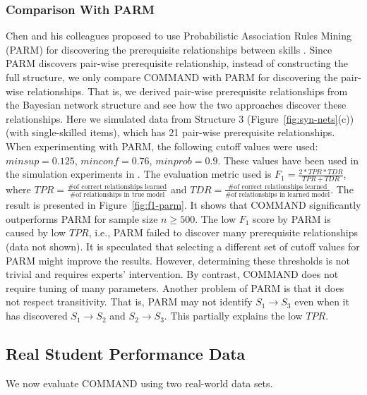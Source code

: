 \documentclass{edm_template}
\begin{document}
	\subsubsection{Comparison With PARM}
	Chen and his colleagues proposed to use Probabilistic Association Rules Mining (PARM) for discovering the prerequisite relationships between skills \cite{chen2015discovering}.
	Since PARM discovers pair-wise prerequisite relationship, instead of constructing the full structure,
	we only compare COMMAND with PARM for discovering the pair-wise relationships.
	That is, we derived pair-wise prerequisite relationships from the Bayesian network structure and see how the two approaches discover these relationships.
	Here we simulated data from Structure 3 (Figure~\ref{fig:syn-nets}(c)) (with single-skilled items), which has 21 pair-wise prerequisite relationships.
	When experimenting with PARM, the following cutoff values were used: $ minsup=0.125$, $minconf=0.76$, $minprob=0.9$.
	These values have been used in the simulation experiments in \cite{chen2015discovering}.
	The evaluation metric used is $F_1=\frac{2*TPR*TDR}{TPR+TDR}$, where $TPR=\frac{\text{\# of correct relationships learned}}{\text{\# of relationships in true model}}$
	and $TDR=\frac{\text{\# of correct relationships learned}}{\text{\# of relationships in learned model}}$.
	The result is presented in Figure~\ref{fig:f1-parm}. It shows that COMMAND significantly outperforms PARM for sample size $n\ge 500$.
	The low $F_1$ score by PARM is caused by low $TPR$, i.e., PARM failed to discover many prerequisite relationships (data not shown).
	It is speculated that selecting a different set of cutoff values for PARM might improve the results.
	However, determining these thresholds is not trivial and requires experts' intervention. By contrast, COMMAND does not require tuning of many parameters.  
	Another problem of PARM is that it does not respect transitivity. 
	That is, PARM may not identify $S_1\rightarrow S_3$ even when it has discovered $S_1\rightarrow S_2$ and $S_2\rightarrow S_3$.
	This partially explains the low $TPR$.	 
	
	\subsection{Real Student Performance Data}
	\label{sec:real}
	We now evaluate COMMAND using two real-world data sets.	
	
\end{document}
